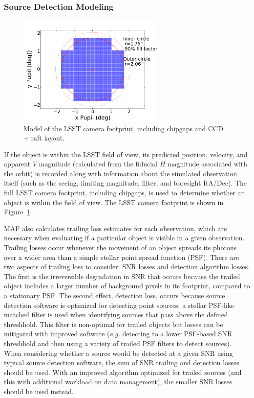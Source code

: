 \subsubsection{Source Detection Modeling}


\begin{figure}[t!]
\centering
\includegraphics[width=0.65\textwidth]{figures/focalplane}
\caption{Model of the LSST camera footprint, including chipgaps and CCD + raft layout. \label{fig:camera_footprint}}
\end{figure}

If the object is within the LSST field of view, its predicted position, velocity, and apparent $V$ magnitude (calculated from the fiducial $H$ magnitude associated with the orbit) is recorded along with information about the simulated observation itself (such as the seeing, limiting magnitude, filter, and boresight RA/Dec). The full LSST camera footprint, including chipgaps, is used to determine whether
an object is within the field of view. The LSST camera footprint is shown in Figure~\ref{fig:camera_footprint}.

MAF also calculates trailing loss estimates for each observation, which are necessary when evaluating if a particular object is visible in a given observation. Trailing losses occur whenever the movement of an object spreads its photons over a wider area than a simple stellar point spread function (PSF). There are two aspects of trailing loss to consider: SNR losses and detection algorithm losses. The first is the
irreversible degradation in SNR that occurs because the trailed object includes a larger number of background pixels in its footprint, compared to a stationary PSF. The second effect, detection loss, occurs because source detection software is optimized for detecting point sources; a stellar PSF-like matched filter is used when identifying sources that pass above the defined threshhold. This filter is non-optimal for trailed objects but losses can be mitigated with improved software ({\it e.g.} detecting to a lower PSF-based SNR threshhold and then using a variety of trailed PSF filters to detect sources). When considering whether a source would be detected at a given SNR using typical source detection software, the sum of SNR trailing and detection losses should be used. With an improved
algorithm optimized for trailed sources (and this with additional workload on data management), the smaller SNR losses should be
used instead.


